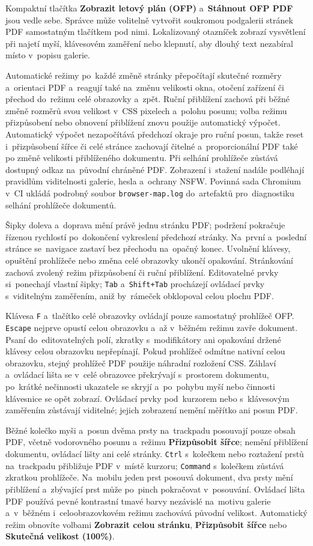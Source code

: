 \documentclass[11pt,a4paper]{article}
\newcommand{\ui}[1]{\textbf{#1}}
\newcommand{\codeword}[1]{\nolinkurl{#1}}
\begin{document}
Kompaktní tlačítka \ui{Zobrazit letový plán (OFP)} a~\ui{Stáhnout OFP PDF} jsou
vedle sebe. Správce může volitelně vytvořit soukromou podgalerii stránek PDF
samostatným tlačítkem pod nimi. Lokalizovaný otazníček zobrazí vysvětlení při
najetí myší, klávesovém zaměření nebo klepnutí, aby dlouhý text nezabíral místo
v~popisu galerie.

Automatické režimy po~každé změně stránky přepočítají skutečné rozměry
a~orientaci PDF a~reagují také na~změnu velikosti okna, otočení zařízení či
přechod do~režimu celé obrazovky a~zpět. Ruční přiblížení zachová při běžné
změně rozměrů svou velikost v~CSS pixelech a~polohu posunu; volba režimu
přizpůsobení nebo obnovení přiblížení znovu použije automatický výpočet.
Automatický výpočet nezapočítává předchozí okraje pro ruční posun, takže reset
i~přizpůsobení šířce či celé stránce zachovají čitelné a~proporcionální PDF také
po změně velikosti přiblíženého dokumentu. Při selhání prohlížeče zůstává
dostupný odkaz na~původní chráněné PDF. Zobrazení i~stažení nadále podléhají
pravidlům viditelnosti galerie, hesla a~ochrany NSFW. Povinná sada Chromium v~CI
ukládá podrobný soubor \codeword{browser-map.log} do~artefaktů pro~diagnostiku
selhání prohlížeče dokumentů.

Šipky doleva a~doprava mění právě jednu stránku PDF; podržení pokračuje řízenou
rychlostí po~dokončení vykreslení předchozí stránky. Na~první a~poslední stránce
se~navigace zastaví bez přechodu na~opačný konec. Uvolnění klávesy, opuštění
prohlížeče nebo změna celé obrazovky ukončí opakování. Stránkování zachová
zvolený režim přizpůsobení či ruční přiblížení. Editovatelné prvky si~ponechají
vlastní šipky; \codeword{Tab} a~\codeword{Shift+Tab} procházejí ovládací prvky
s~viditelným zaměřením, aniž by~rámeček obklopoval celou plochu PDF.

Klávesa \codeword{F} a~tlačítko celé obrazovky ovládají pouze samostatný
prohlížeč OFP. \codeword{Escape} nejprve opustí celou obrazovku a~až v~běžném
režimu zavře dokument. Psaní do~editovatelných polí, zkratky s~modifikátory ani
opakování držené klávesy celou obrazovku nepřepínají. Pokud prohlížeč odmítne
nativní celou obrazovku, stejný prohlížeč PDF použije náhradní rozložení CSS.
Záhlaví a~ovládací lišta se v~celé obrazovce překrývají s~prostorem dokumentu,
po~krátké nečinnosti ukazatele se skryjí a~po~pohybu myší nebo činnosti
klávesnice se opět zobrazí. Ovládací prvky pod~kurzorem nebo s~klávesovým
zaměřením zůstávají viditelné; jejich zobrazení nemění měřítko ani posun PDF.

Běžné kolečko myši a~posun dvěma prsty na~trackpadu posouvají pouze obsah PDF,
včetně vodorovného posunu a~režimu \ui{Přizpůsobit šířce}; nemění přiblížení
dokumentu, ovládací lišty ani celé stránky. \codeword{Ctrl} s~kolečkem nebo
roztažení prstů na~trackpadu přibližuje PDF v~místě kurzoru; \codeword{Command}
s~kolečkem zůstává zkratkou prohlížeče. Na~mobilu jeden prst posouvá dokument,
dva prsty mění přiblížení a~zbývající prst může po~pinch pokračovat v~posouvání.
Ovládací lišta PDF používá pevné kontrastní tmavé barvy nezávislé na~motivu
galerie a~v~běžném i~celoobrazovkovém režimu zachovává původní velikost.
Automatický režim obnovíte volbami \ui{Zobrazit celou stránku}, \ui{Přizpůsobit
šířce} nebo \ui{Skutečná velikost (100\%)}.
\end{document}
